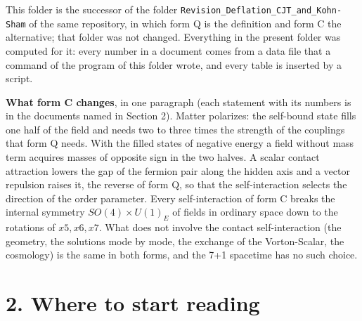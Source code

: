 \documentclass[
  10pt,
]{article}
\begin{document}
This folder is the successor of the folder
\texttt{Revision\_Deflation\_CJT\_and\_Kohn-Sham} of the same
repository, in which form Q is the definition and form C the
alternative; that folder was not changed. Everything in the present
folder was computed for it: every number in a document comes from a data
file that a command of the program of this folder wrote, and every table
is inserted by a script.

\textbf{What form C changes}, in one paragraph (each statement with its
numbers is in the documents named in Section 2). Matter polarizes: the
self-bound state fills one half of the field and needs two to three
times the strength of the couplings that form Q needs. With the filled
states of negative energy a field without mass term acquires masses of
opposite sign in the two halves. A scalar contact attraction lowers the
gap of the fermion pair along the hidden axis and a vector repulsion
raises it, the reverse of form Q, so that the self-interaction selects
the direction of the order parameter. Every self-interaction of form C
breaks the internal symmetry \(SO(4)\times U(1)_E\) of fields in
ordinary space down to the rotations of \(x5,x6,x7\). What does not
involve the contact self-interaction (the geometry, the solutions mode
by mode, the exchange of the Vorton-Scalar, the cosmology) is the same
in both forms, and the 7+1 spacetime has no such choice.

\hypertarget{where-to-start-reading}{%
\section{2. Where to start reading}\label{where-to-start-reading}}
\end{document}
